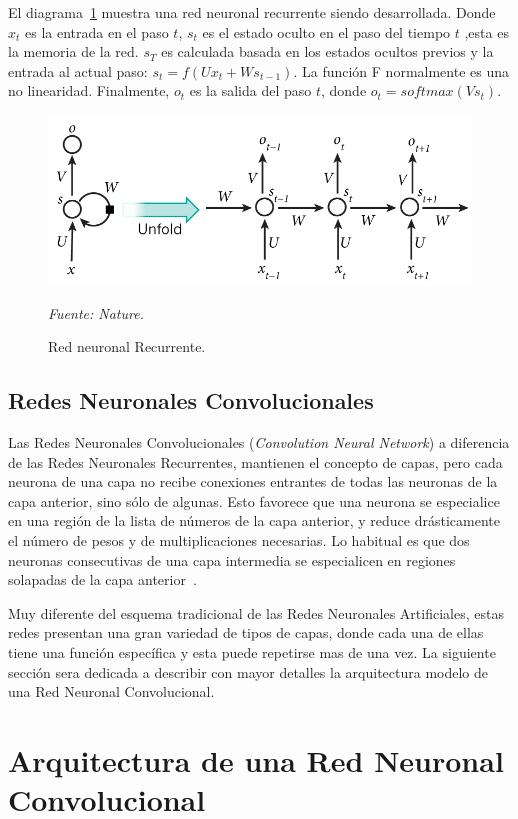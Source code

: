 El diagrama~\ref{fig:rnn} muestra una red neuronal recurrente siendo desarrollada. Donde $x_t$ es la entrada en el paso $t$, $s_t$ es el estado oculto en el paso del tiempo $t$ ,esta es la memoria de la red. $s_T$ es calculada basada en los estados ocultos previos y la entrada al actual paso: $s_t = f(U x_t + W s_{t-1})$. La función F normalmente es una no linearidad. Finalmente, $o_t$ es la salida del paso $t$, donde $o_t = softmax(V s_t)$. 
\begin{figure}[H]
		\centering
		\includegraphics[width=130mm]{Imagenes/rnn.jpg}
		\caption{Red neuronal Recurrente.}
		\vspace{0.15cm}
		\textit{Fuente: Nature.}
		\label{fig:rnn}
\end{figure}
\subsection{Redes Neuronales Convolucionales}
Las Redes Neuronales Convolucionales (\textit{Convolution Neural Network}) a diferencia de las Redes Neuronales Recurrentes, mantienen el concepto de capas, pero cada neurona de una capa no recibe conexiones entrantes de todas las neuronas de la capa anterior, sino sólo de algunas. Esto favorece que una neurona se especialice en una región de la lista de números de la capa anterior, y reduce drásticamente el número de pesos y de multiplicaciones necesarias. Lo habitual es que dos neuronas consecutivas de una capa intermedia se especialicen en regiones solapadas de la capa anterior~\cite{16pusiol2014redes}.

Muy diferente del esquema tradicional de las Redes Neuronales Artificiales, estas redes presentan una gran variedad de tipos de capas, donde cada una de ellas tiene una función específica y esta puede repetirse mas de una vez. La siguiente sección sera dedicada a describir con mayor detalles la arquitectura modelo de una Red Neuronal Convolucional.

\section{Arquitectura de una Red Neuronal Convolucional}

